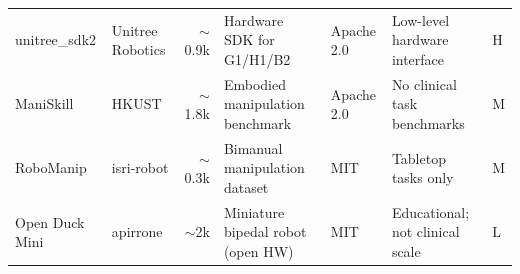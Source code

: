 \begin{table}[t]
{\begin{tabular}{@{}llrllp{4.5cm}l@{}}
    unitree\_sdk2      & Unitree Robotics   & $\sim$0.9k & Hardware SDK for G1/H1/B2         & Apache 2.0  & Low-level hardware interface           & H \\
    ManiSkill          & HKUST              & $\sim$1.8k & Embodied manipulation benchmark   & Apache 2.0  & No clinical task benchmarks            & M \\
    RoboManip          & isri-robot         & $\sim$0.3k & Bimanual manipulation dataset     & MIT         & Tabletop tasks only                    & M \\
    Open Duck Mini     & apirrone           & $\sim$2k   & Miniature bipedal robot (open HW) & MIT         & Educational; not clinical scale        & L \\
    \bottomrule
  \end{tabular}%
  }
\end{table}


